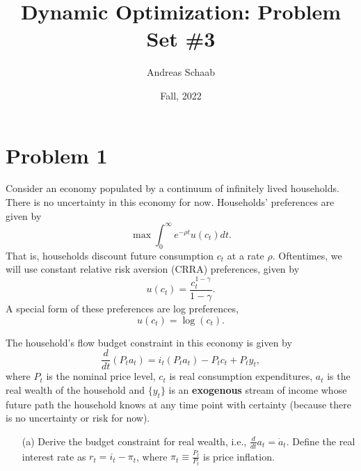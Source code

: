 \documentclass[11pt]{extarticle}
\title{Dynamic Optimization: Problem Set \#3}
\author{Andreas Schaab}
\date{Fall, 2022}
\theoremstyle{plain}
\theoremstyle{definition}
\begin{document}
\maketitle
\thispagestyle{empty}
\setcounter{page}{0}


\vspace{10mm}
\section*{Problem 1}


Consider an economy populated by a continuum of infinitely lived households. There is no uncertainty in this economy for now. Households' preferences are given by
\begin{equation*}
	\max \int_0^\infty e^{-\rho t} u(c_t) dt.
\end{equation*}
That is, households discount future consumption $c_t$ at a rate $\rho$. Oftentimes, we will use constant relative risk aversion (CRRA) preferences, given by
\begin{equation*}
	u(c_t) = \frac{c_t^{1-\gamma}}{1-\gamma}.
\end{equation*}
A special form of these preferences are log preferences, 
\begin{equation*}
	u(c_t) = \log(c_t). 
\end{equation*}



The household's flow budget constraint in this economy is given by
\begin{equation*}
	\frac{d}{dt}(P_t a_t) = i_t (P_t a_t) - P_t c_t + P_t y_t,
\end{equation*}
where $P_t$ is the nominal price level, $c_t$ is real consumption expenditures, $a_t$ is the real wealth of the household and $\{y_t\}$ is an \textbf{exogenous} stream of income whose future path the household knows at any time point with certainty (because there is no uncertainty or risk for now).


\vspace{5mm}
\begin{enumerate}
\item [(a)] Derive the budget constraint for real wealth, i.e., $\frac{d}{dt} a_t = \dot a_t$. Define the real interest rate as $r_t = i_t - \pi_t$, where $\pi_t \equiv \frac{\dot P_t}{P_t}$ is price inflation.
\end{enumerate}
\end{document}

